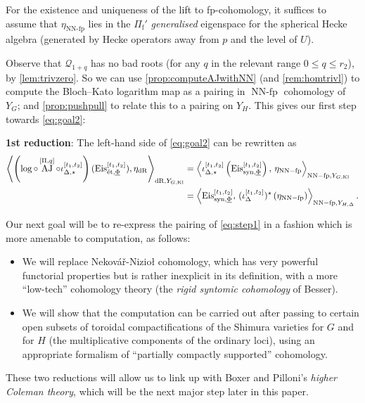 \documentclass[cjm]{ipart}
\theoremstyle{plain}
\theoremstyle{remark}
\DeclareMathOperator{\AJ}{AJ}
\DeclareMathOperator{\Kl}{Kl}
\DeclareMathOperator{\NNfp}{NN-fp}
\DeclareMathOperator{\syn}{syn}
\newcommand{\Eis}{\mathrm{Eis}}
\newcommand{\Nek}{Nekov\'a\v{r}\xspace}
\newcommand{\Niz}{Nizio\l\xspace}
\newcommand{\Pif}{\Pi_{\mathrm{f}}}
\newcommand{\cQ}{\mathcal{Q}}
\newcommand{\dR}{\mathrm{dR}}
\newcommand{\et}{\text{\textup{\'et}}}
\newcommand{\uPhi}{\underline{\Phi}}
\numberwithin{equation}{subsection}
\renewcommand{\le}{\leqslant}
\begin{document}
  \begin{remark}\label{rem:Quniqueness}
   For the existence and uniqueness of the lift to fp-cohomology, it suffices to assume that $\eta_{\NNfp}$ lies in the $\Pif'$ \emph{generalised} eigenspace for the spherical Hecke algebra (generated by Hecke operators away from $p$ and the level of $U$).
  \end{remark}

  Observe that $\cQ_{1+q}$ has no bad roots (for any $q$ in the relevant range $0 \le q \le r_2$), by \cref{lem:trivzero}. So we can use \cref{prop:computeAJwithNN} (and \cref{rem:homtrivl}) to compute the Bloch--Kato logarithm map as a pairing in $\NNfp$ cohomology of $Y_G$; and \cref{prop:pushpull} to relate this to a pairing on $Y_H$. This gives our first step towards \eqref{eq:goal2}:
  \vspace{1ex}

  \begin{mdframed}
   \textbf{1st reduction}: The left-hand side of \eqref{eq:goal2} can be rewritten as
   \begin{equation}
   \label{eq:step1}
   \begin{aligned}
   \left\langle \left(\log \circ \AJ^{[\Pi, q]} \circ \iota^{[t_1,t_2]}_{\Delta, \star}\right)(\Eis^{[t_1, t_2]}_{\et, \uPhi}),\eta_{\dR}\right\rangle_{\dR, Y_{G, \Kl}}
   &=
   \left\langle \iota_{\Delta, \star}^{[t_1,t_2]}\left( \Eis^{[t_1,t_2]}_{\syn,\uPhi}\right),\, \eta_{\NNfp}\right\rangle_{\NNfp,Y_{G, \Kl}} \\
   &= \left\langle \Eis^{[t_1,t_2]}_{\syn,\uPhi},\, (\iota_{\Delta}^{[t_1,t_2]} )^\star \left(\eta_{\NNfp}\right)\right\rangle_{\NNfp,Y_{H, \Delta}}.
   \end{aligned}
   \end{equation}
   \end{mdframed}



 Our next goal will be to re-express the pairing of \eqref{eq:step1} in a fashion which is more amenable to computation, as follows:
 \begin{itemize}
 \item We will replace \Nek-\Niz cohomology, which has very powerful functorial properties but is rather inexplicit in its definition, with a more ``low-tech'' cohomology theory (the \emph{rigid syntomic cohomology} of Besser).

 \item We will show that the computation can be carried out after passing to certain open subsets of toroidal compactifications of the Shimura varieties for $G$ and for $H$ (the multiplicative components of the ordinary loci), using an appropriate formalism of ``partially compactly supported'' cohomology.
 \end{itemize}
 These two reductions will allow us to link up with Boxer and Pilloni's \emph{higher Coleman theory}, which will be the next major step later in this paper.
\end{document}
